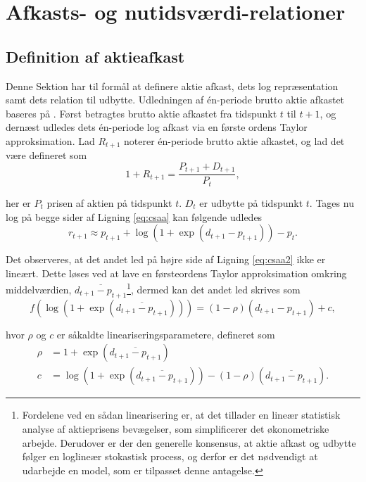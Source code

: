 \documentclass[
  a4paper,
  oneside]{memoir}
\begin{document}
\hypertarget{afkognut}{%
\section{Afkasts- og nutidsværdi-relationer}\label{afkognut}}

\hypertarget{defaktafk}{%
\subsection{Definition af aktieafkast}\label{defaktafk}}

Denne Sektion har til formål at definere aktie afkast, dets log repræsentation samt dets relation til udbytte. Udledningen af én-periode brutto aktie afkastet baseres på \citep{Campbell1988}. Først betragtes brutto aktie afkastet fra tidspunkt \(t\) til \(t+1\), og dernæst udledes dets én-periode log afkast via en første ordens Taylor approksimation. Lad \(R_{t+1}\) noterer én-periode brutto aktie afkastet, og lad det være defineret som
\begin{equation}
1+R_{t+1}=\frac{P_{t+1}+D_{t+1}}{P_t}, \label{eq:csaa}
\end{equation}

her er \(P_t\) prisen af aktien på tidspunkt \(t\). \(D_t\) er udbytte på tidspunkt \(t\). Tages nu log på begge sider af Ligning \eqref{eq:csaa} kan følgende udledes
\begin{equation}
r_{t+1}\approx p_{t+1}+\log\left(1+\exp\left(d_{t+1}-p_{t+1}\right)\right)-p_t. \label{eq:csaa2}
\end{equation}

Det observeres, at det andet led på højre side af Ligning \eqref{eq:csaa2} ikke er lineært. Dette løses ved at lave en førsteordens Taylor approksimation omkring middelværdien, \(\overline{d_{t+1}-p_{t+1}}\)\footnote{Fordelene ved en sådan linearisering er, at det tillader en lineær statistisk analyse af aktieprisens bevægelser, som simplificerer det økonometriske arbejde. Derudover er der den generelle konsensus, at aktie afkast og udbytte følger en loglineær stokastisk process, og derfor er det nødvendigt at udarbejde en model, som er tilpasset denne antagelse.}, dermed kan det andet led skrives som
\begin{equation}
f\left(\log\left(1+\exp\left(\overline{d_{t+1}-p_{t+1}}\right)\right)\right) = (1-\rho)(d_{t+1}-p_{t+1}) + c, \label{eq:csaa3}
\end{equation}

hvor \(\rho\) og \(c\) er såkaldte lineariseringsparametere, defineret som
\begin{align*}
\rho&=1+\exp\left(\overline{d_{t+1}-p_{t+1}}\right)\\
c&=\log\left(1+\exp\left(\overline{d_{t+1}-p_{t+1}}\right)\right)-(1-\rho)(\overline{d_{t+1}-p_{t+1}}).
\end{align*}
\end{document}
